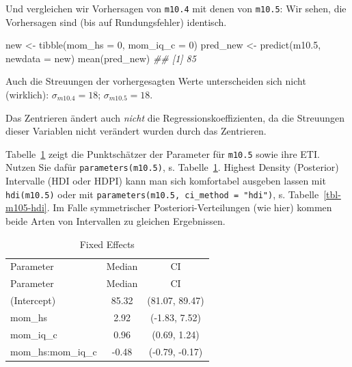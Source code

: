 \documentclass[
  ngerman,
  letterpaper,
  twoside,
  open=any]{scrbook}
\newenvironment{Shaded}{\begin{snugshade}}{\end{snugshade}}
\newcommand{\AttributeTok}[1]{\textcolor[rgb]{0.40,0.45,0.13}{#1}}
\newcommand{\DecValTok}[1]{\textcolor[rgb]{0.68,0.00,0.00}{#1}}
\newcommand{\DocumentationTok}[1]{\textcolor[rgb]{0.37,0.37,0.37}{\textit{#1}}}
\newcommand{\FloatTok}[1]{\textcolor[rgb]{0.68,0.00,0.00}{#1}}
\newcommand{\FunctionTok}[1]{\textcolor[rgb]{0.28,0.35,0.67}{#1}}
\newcommand{\NormalTok}[1]{\textcolor[rgb]{0.00,0.23,0.31}{#1}}
\newcommand{\OtherTok}[1]{\textcolor[rgb]{0.00,0.23,0.31}{#1}}
\theoremstyle{definition}
\theoremstyle{plain}
\theoremstyle{definition}
\theoremstyle{definition}
\theoremstyle{definition}
\theoremstyle{definition}
\theoremstyle{remark}
\begin{document}
Und vergleichen wir Vorhersagen von \texttt{m10.4} mit denen von
\texttt{m10.5}: Wir sehen, die Vorhersagen sind (bis auf Rundungsfehler)
identisch.

\begin{Shaded}
\begin{Highlighting}[]
\NormalTok{new }\OtherTok{\textless{}{-}} \FunctionTok{tibble}\NormalTok{(}\AttributeTok{mom\_hs =} \DecValTok{0}\NormalTok{, }\AttributeTok{mom\_iq\_c =} \DecValTok{0}\NormalTok{)}
\NormalTok{pred\_new }\OtherTok{\textless{}{-}} \FunctionTok{predict}\NormalTok{(m10}\FloatTok{.5}\NormalTok{, }\AttributeTok{newdata =}\NormalTok{ new)}
\FunctionTok{mean}\NormalTok{(pred\_new)}
\DocumentationTok{\#\# [1] 85}
\end{Highlighting}
\end{Shaded}

Auch die Streuungen der vorhergesagten Werte unterscheiden sich nicht
(wirklich): \(\sigma_{m10.4}= 18\); \(\sigma_{m10.5}= 18\).

Das Zentrieren ändert auch \emph{nicht} die Regressionskoeffizienten, da
die Streuungen dieser Variablen nicht verändert wurden durch das
Zentrieren.

Tabelle~\ref{tbl-m105} zeigt die Punktschätzer der Parameter für
\texttt{m10.5} sowie ihre ETI. Nutzen Sie dafür
\texttt{parameters(m10.5)}, s. Tabelle~\ref{tbl-m105}. Highest Density
(Posterior) Intervalle (HDI oder HDPI) kann man sich komfortabel
ausgeben lassen mit \texttt{hdi(m10.5)} oder mit
\texttt{parameters(m10.5,\ ci\_method\ =\ "hdi")}, s.
Tabelle~\ref{tbl-m105-hdi}. Im Falle symmetrischer
Posteriori-Verteilungen (wie hier) kommen beide Arten von Intervallen zu
gleichen Ergebnissen.

\begin{longtable}[]{@{}lcc@{}}

\caption{\label{tbl-m105}Parameter von m10.5 und ETIs}

\tabularnewline

\caption{Fixed Effects}\tabularnewline
\toprule\noalign{}
Parameter & Median & CI \\
\midrule\noalign{}
\endfirsthead
\toprule\noalign{}
Parameter & Median & CI \\
\midrule\noalign{}
\endhead
\bottomrule\noalign{}
\endlastfoot
(Intercept) & 85.32 & (81.07, 89.47) \\
mom\_hs & 2.92 & (-1.83, 7.52) \\
mom\_iq\_c & 0.96 & (0.69, 1.24) \\
mom\_hs:mom\_iq\_c & -0.48 & (-0.79, -0.17) \\

\end{longtable}
\end{document}
